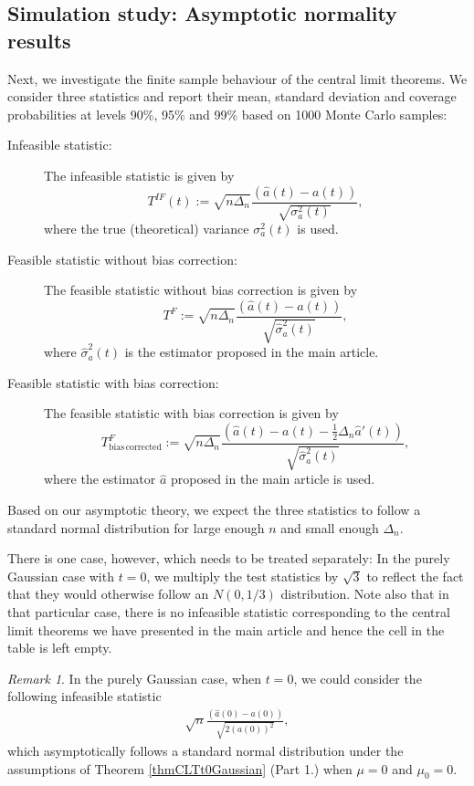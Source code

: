 \documentclass{article}
\theoremstyle{plain}
\theoremstyle{definition}
\theoremstyle{remark}
\newtheorem{remark}{Remark}[section]
\begin{document}
\begin{appendix}
\newlength{\origtopmargin}
\setlength{\origtopmargin}{\topmargin}


\section{Simulation study: Asymptotic normality results}\label{asec:asymGauss}

Next, we investigate the finite sample behaviour of the central limit theorems.
We consider three statistics and report their mean, standard deviation and coverage probabilities at levels 90\%, 95\% and 99\% based on 1000 Monte Carlo samples:
\begin{description}
	\item[Infeasible statistic:] The infeasible statistic is given by 
	$$T^{IF}(t):=\sqrt{n\Delta_{n}}\frac{\left(\hat{a}(t)-a(t)\right)}{\sqrt{\sigma_a^2(t)}},$$
	where the true (theoretical) variance $\sigma_a^2(t)$ is used. 
	\item[Feasible statistic without bias correction:]
	The feasible statistic without bias correction is given by 
	$$T^{F}:=\sqrt{n\Delta_{n}}\frac{\left(\hat{a}(t)-a(t)\right)}{\sqrt{\hat \sigma_a^2(t)}},$$
	where $\hat \sigma_a^2(t)$ is the estimator proposed in the main article. 
	\item[Feasible statistic with bias correction:]
	The feasible statistic with bias correction is given by
	$$T^{F}_{\mathrm{bias \, corrected}}:=\sqrt{n\Delta_{n}}\frac{\left(\hat{a}(t)-a(t)-\frac{1}{2}\Delta_n \hat a'(t)\right)}{\sqrt{\hat \sigma_a^2(t)}},$$
	where the estimator $\hat a$ proposed in the main article is used. 
\end{description}
Based on our asymptotic theory, we expect the three statistics to follow a standard normal distribution for large enough $n$ and small enough $\Delta_n$.

There is one case, however, which needs to be treated separately: In the purely Gaussian case with $t=0$, we multiply the test statistics by $\sqrt{3}$ to reflect the fact that they would otherwise follow an $N(0, 1/3)$ distribution. Note also that in that particular case, there is no infeasible statistic corresponding to the central limit theorems we have presented in the main article and hence the cell in the table is left empty. 

\begin{remark}
	In the purely Gaussian case, when $t=0$, we could consider the following infeasible statistic
	\begin{align*}
		\sqrt{n} \frac{ (\hat a(0)-a(0))}{\sqrt{2 (a(0))^2}},
	\end{align*}
	which asymptotically follows a standard normal distribution under the assumptions of Theorem  \ref{thmCLTt0Gaussian} (Part 1.) when $\mu=0$ and $\mu_0=0$.
\end{remark}



\end{appendix}
\end{document}
